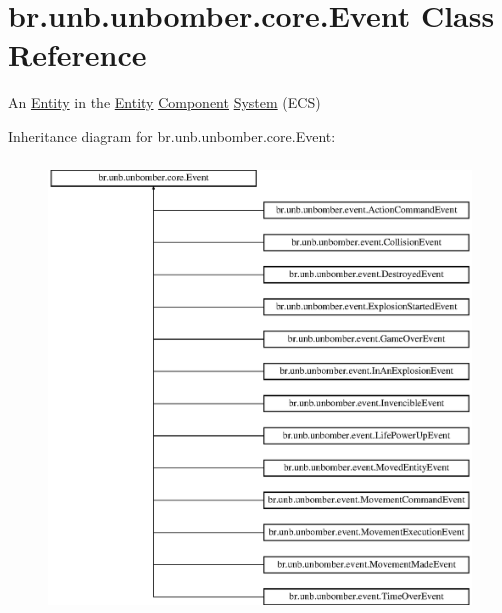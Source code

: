 \hypertarget{classbr_1_1unb_1_1unbomber_1_1core_1_1_event}{\section{br.\+unb.\+unbomber.\+core.\+Event Class Reference}
\label{classbr_1_1unb_1_1unbomber_1_1core_1_1_event}
}


An \hyperlink{classbr_1_1unb_1_1unbomber_1_1core_1_1_entity}{Entity} in the \hyperlink{classbr_1_1unb_1_1unbomber_1_1core_1_1_entity}{Entity} \hyperlink{classbr_1_1unb_1_1unbomber_1_1core_1_1_component}{Component} \hyperlink{interfacebr_1_1unb_1_1unbomber_1_1core_1_1_system}{System} (E\+C\+S)  


Inheritance diagram for br.\+unb.\+unbomber.\+core.\+Event\+:\begin{figure}[H]
\begin{center}
\leavevmode
\includegraphics[height=12.000000cm]{classbr_1_1unb_1_1unbomber_1_1core_1_1_event}
\end{center}
\end{figure}
